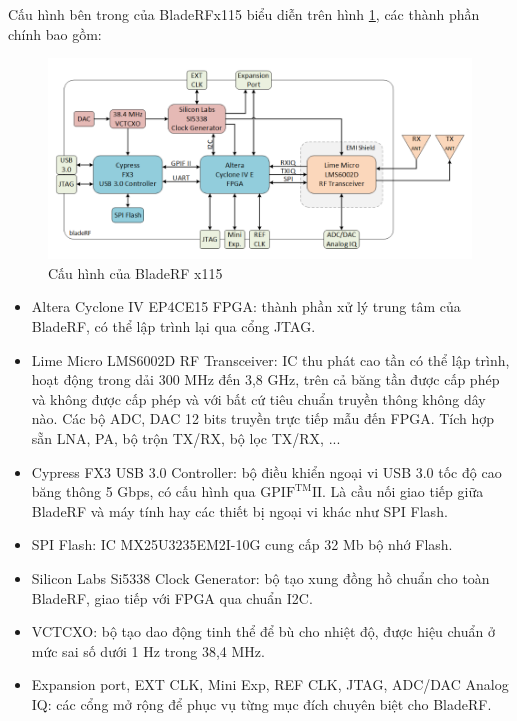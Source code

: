 Cấu hình bên trong của BladeRFx115 biểu diễn trên hình \ref{fig:structbladeRF}, các thành phần chính bao gồm: 

\begin{figure} [!htb]
	\centering
	\includegraphics[width=1\linewidth]{figures/structbladeRF.png}
	\caption{Cấu hình của BladeRF x115}
	\label{fig:structbladeRF}
\end{figure}

\begin{itemize}
	\item	Altera Cyclone IV EP4CE15 FPGA: thành phần xử lý trung tâm của BladeRF, có thể lập trình lại qua cổng JTAG.
	\item 	Lime Micro LMS6002D RF Transceiver: IC thu phát cao tần có thể lập trình, hoạt động trong dải 300 MHz đến 3,8 GHz, trên cả băng tần được cấp phép và không được cấp phép và với bất cứ tiêu chuẩn truyền thông không dây nào. Các bộ ADC, DAC 12 bits truyền trực tiếp mẫu đến FPGA. Tích hợp sẵn LNA, PA, bộ trộn TX/RX, bộ lọc TX/RX, ...
	\item   Cypress FX3 USB 3.0 Controller: bộ điều khiển ngoại vi USB 3.0 tốc độ cao băng thông 5 Gbps, có cấu hình qua $\mathrm{GPIF^{TM} II}$. Là cầu nối giao tiếp giữa BladeRF và máy tính hay các thiết bị ngoại vi khác như SPI Flash.
	\item   SPI Flash: IC MX25U3235EM2I-10G cung cấp 32 Mb bộ nhớ Flash.
	\item   Silicon Labs Si5338 Clock Generator: bộ tạo xung đồng hồ chuẩn cho toàn BladeRF, giao tiếp với FPGA qua chuẩn I2C.
	\item 	VCTCXO: bộ tạo dao động tinh thể để bù cho nhiệt độ, được hiệu chuẩn ở mức sai số dưới 1 Hz trong 38,4 MHz.
	\item 	Expansion port, EXT CLK, Mini Exp, REF CLK, JTAG, ADC/DAC Analog IQ: các cổng mở rộng để phục vụ từng mục đích chuyên biệt cho BladeRF.
\end{itemize}

